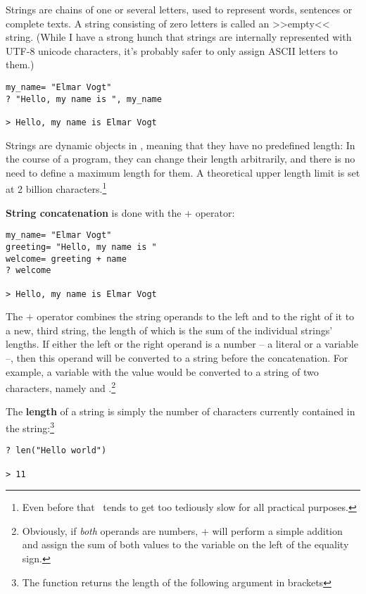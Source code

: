 Strings are chains of one or several letters, used to represent words,
sentences or complete texts. A string consisting of zero letters is
called an >>empty<< string.  (While I have a strong
hunch that strings are internally represented with UTF-8 unicode
characters, it's probably safer to only assign ASCII letters to them.)

\begin{lstlisting}
my_name= "Elmar Vogt"
? "Hello, my name is ", my_name

> Hello, my name is Elmar Vogt
\end{lstlisting}

Strings are dynamic objects in \SB, meaning that they have no
predefined length: In the course of a program, they can change their
length arbitrarily, and there is no need to define a maximum length for
them. A theoretical upper length limit is set at 2 billion
characters.\footnote{Even before that \SB\ tends to get too tediously
slow for all practical purposes.}

\textbf{String concatenation} is done with the $+$ operator: 

\begin{lstlisting}
my_name= "Elmar Vogt"
greeting= "Hello, my name is "
welcome= greeting + name
? welcome

> Hello, my name is Elmar Vogt
\end{lstlisting}

The $+$ operator combines the string operands to the left and to the
right of it to a new, third string, the length of which is the sum of
the individual strings' lengths. If either the left or the right operand
is a number -- a literal or a variable --, then this operand will be
converted to a string before the concatenation. For example, a variable
with the value  would be converted to a string of two characters,
namely  and .\footnote{Obviously, if \emph{both} operands are
numbers, $+$ will perform a simple addition and assign the sum of both
values to the variable on the left of the equality sign.}

The \textbf{length} of a string  is simply the
number of characters currently contained in the string:\footnote{The
function  returns the length of the following argument in
brackets}

\begin{lstlisting}
? len("Hello world")

> 11
\end{lstlisting}

